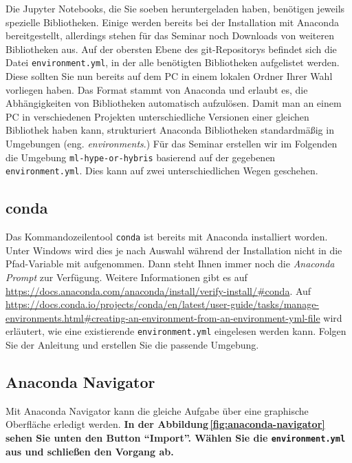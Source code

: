 \documentclass{tufte-handout}
\begin{document}
Die Jupyter Notebooks, die Sie soeben heruntergeladen haben, benötigen jeweils spezielle Bibliotheken.
Einige werden bereits bei der Installation mit Anaconda bereitgestellt, allerdings stehen für das Seminar noch Downloads von weiteren Bibliotheken aus.
Auf der obersten Ebene des git-Repositorys befindet sich die Datei \texttt{environment.yml}, in der alle benötigten Bibliotheken aufgelistet werden.
Diese sollten Sie nun bereits auf dem PC in einem lokalen Ordner Ihrer Wahl vorliegen haben.
Das Format stammt von Anaconda und erlaubt es, die Abhängigkeiten von Bibliotheken automatisch aufzulösen.
Damit man an einem PC in verschiedenen Projekten unterschiedliche Versionen einer gleichen Bibliothek haben kann,
strukturiert Anaconda Bibliotheken standardmäßig in Umgebungen (eng. \emph{environments}.)
Für das Seminar erstellen wir im Folgenden die Umgebung \texttt{ml-hype-or-hybris} basierend auf der gegebenen \texttt{environment.yml}.
Dies kann auf zwei unterschiedlichen Wegen geschehen.

\subsection{conda}

Das Kommandozeilentool \texttt{conda} ist bereits mit Anaconda installiert worden.
Unter Windows wird dies je nach Auswahl während der Installation nicht in die Pfad-Variable mit aufgenommen.
Dann steht Ihnen immer noch die \emph{Anaconda Prompt} zur Verfügung.
Weitere Informationen gibt es auf
\url{https://docs.anaconda.com/anaconda/install/verify-install/#conda}.
Auf
\url{https://docs.conda.io/projects/conda/en/latest/user-guide/tasks/manage-environments.html#creating-an-environment-from-an-environment-yml-file}
wird erläutert, wie eine existierende \texttt{environment.yml} eingelesen werden kann.
Folgen Sie der Anleitung und erstellen Sie die passende Umgebung.

\subsection{Anaconda Navigator}

Mit Anaconda Navigator kann die gleiche Aufgabe über eine graphische Oberfläche erledigt werden.
{
  \bfseries
  In der Abbildung\,\ref{fig:anaconda-navigator} sehen Sie unten den Button \enquote{Import}.
  Wählen Sie die \texttt{environment.yml} aus und schließen den Vorgang ab. 
}
\end{document}
